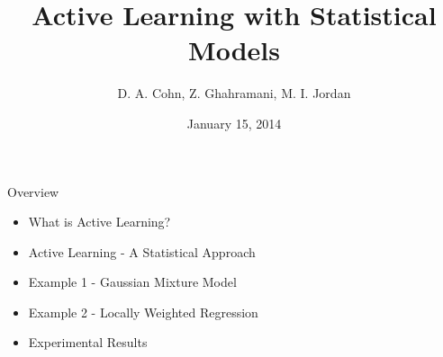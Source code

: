 \documentclass{beamer}
\begin{document}
\title{Active Learning with Statistical Models}
\subtitle{D. A. Cohn, Z. Ghahramani, M. I. Jordan}

\author[S. Fuchs]{}

\date[15.01.2014]{January 15, 2014}

\begin{frame}[plain]
  \titlepage
\end{frame}

\begin{frame}{Overview}
\begin{itemize}
  \item What is Active Learning?
  \item Active Learning - A Statistical Approach
  \item Example 1 - Gaussian Mixture Model
  \item Example 2 - Locally Weighted Regression
  \item Experimental Results
\end{itemize}
\end{frame}
\end{document}
